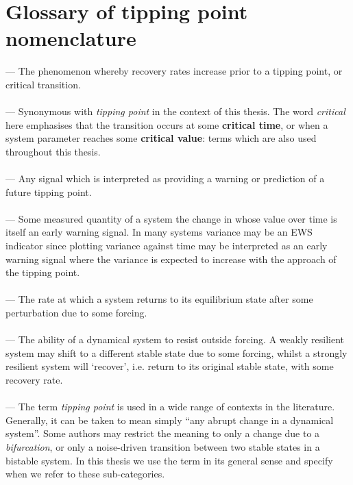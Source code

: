 \documentclass[a4paper,10pt,times,custombib, print]{PhDThesisPSnPDF}
\begin{document}
\frontmatter

\maketitle



\tableofcontents

\chapter{Glossary of tipping point nomenclature}
{\small
{} — The phenomenon whereby recovery rates increase prior to a tipping point, or critical transition.\\
\vspace{-0.3cm}\\
 — Synonymous with \emph{tipping point} in the context of this thesis. The word \emph{critical} here emphasises that the transition occurs at some {\bf critical time}, or when a system parameter reaches some {\bf critical value}: terms which are also used throughout this thesis.\\
\vspace{-0.3cm}\\
 — Any signal which is interpreted as providing a warning or prediction of a future tipping point.\\
\vspace{-0.3cm}\\
 — Some measured quantity of a system the change in whose value over time is itself an early warning signal. In many systems variance may be an EWS indicator since plotting variance against time may be interpreted as an early warning signal where the variance is expected to increase with the approach of the tipping point. \\
\vspace{-0.3cm}\\
 — The rate at which a system returns to its equilibrium state after some perturbation due to some forcing. \\
\vspace{-0.3cm}\\
 — The ability of a dynamical system to resist outside forcing. A weakly resilient system may shift to a different stable state due to some forcing, whilst a strongly resilient system will `recover', i.e. return to its original stable state, with some recovery rate. \\
\vspace{-0.3cm}\\
 — The term \emph{tipping point} is used in a wide range of contexts in the literature. Generally, it can be taken to mean simply ``any abrupt change in a dynamical system''. Some authors may restrict the meaning to only a change due to a \emph{bifurcation}, or only a noise-driven transition between two stable states in a bistable system. In this thesis we use the term in its general sense and specify when we refer to these sub-categories.\\

}
\end{document}
